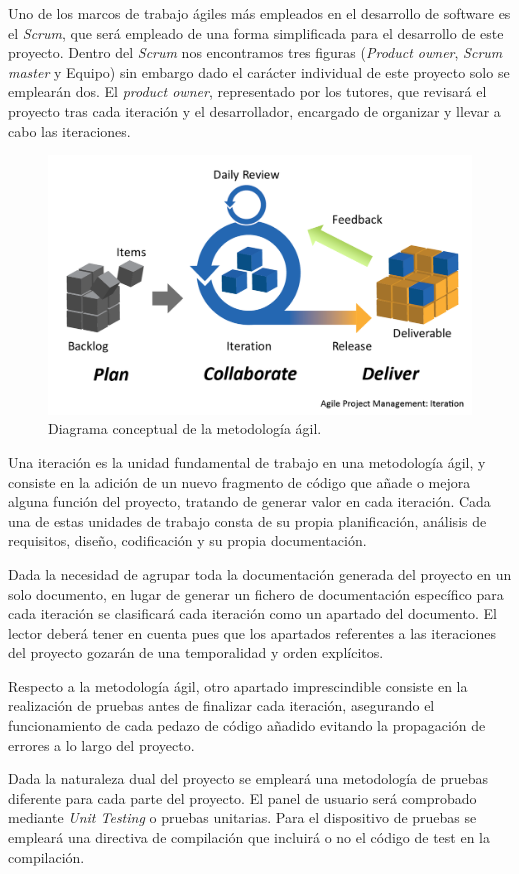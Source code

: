     Uno de los marcos de trabajo ágiles más empleados en el desarrollo de software es el \textit{Scrum}, que será empleado de una forma simplificada para el desarrollo de este proyecto. Dentro del \textit{Scrum} nos encontramos tres figuras (\textit{Product owner}, \textit{Scrum master} y Equipo) sin embargo dado el carácter individual de este proyecto solo se emplearán dos. El \textit{product owner}, representado por los tutores, que revisará el proyecto tras cada iteración y el desarrollador, encargado de organizar y llevar a cabo las iteraciones.

    \begin{figure}[H]  
        \centering
            \includegraphics[width =0.9\linewidth]{figuras/Agile.png}
        \caption{Diagrama conceptual de la metodología ágil.}
        \label{fig:agile}
    \end{figure}

    Una iteración es la unidad fundamental de trabajo en una metodología ágil, y consiste en la adición de un nuevo fragmento de código que añade o mejora alguna función del proyecto, tratando de generar valor en cada iteración. Cada una de estas unidades de trabajo consta de su propia planificación, análisis de requisitos, diseño, codificación y su propia documentación.

    Dada la necesidad de agrupar toda la documentación generada del proyecto en un solo documento, en lugar de generar un fichero de documentación específico para cada iteración se clasificará cada iteración como un apartado del documento. El lector deberá tener en cuenta pues que los apartados referentes a las iteraciones del proyecto gozarán de una temporalidad y orden explícitos.
    
    Respecto a la metodología ágil, otro apartado imprescindible consiste en la realización de pruebas antes de finalizar cada iteración, asegurando el funcionamiento de cada pedazo de código añadido evitando la propagación de errores a lo largo del proyecto.
    
    Dada la naturaleza dual del proyecto se empleará una metodología de pruebas diferente para cada parte del proyecto. El panel de usuario será comprobado mediante \textit{Unit Testing} o pruebas unitarias. Para el dispositivo de pruebas se empleará una directiva de compilación que incluirá o no el código de test en la compilación.

\clearpage

\chapterend{}
